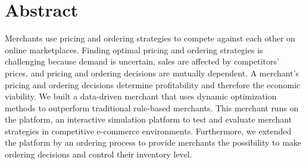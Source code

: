 \chapter*{Abstract}
Merchants use pricing and ordering strategies to compete against each other on online marketplaces.
Finding optimal pricing and ordering strategies is challenging because demand is uncertain, sales are affected by competitors' prices, and pricing and ordering decisions are mutually dependent.
A merchant's pricing and ordering decisions determine profitability and therefore the economic viability.
We built a data-driven merchant that uses dynamic optimization methods to outperform traditional rule-based merchants.
This merchant runs on the \pricewars platform, an interactive simulation platform to test and evaluate merchant strategies in competitive e-commerce environments.
Furthermore, we extended the platform by an ordering process to provide merchants the possibility to make ordering decisions and control their inventory level.


%
